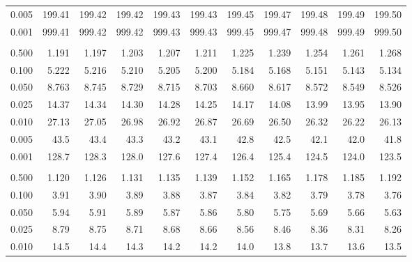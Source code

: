 \documentclass[
]{article}
\begin{document}
\begin{longtable}[t]{lrrrrrrrrrr}
\hspace{1em}0.005 & 199.41 & 199.42 & 199.42 & 199.43 & 199.43 & 199.45 & 199.47 & 199.48 & 199.49 & 199.50\\
\hspace{1em}0.001 & 999.41 & 999.42 & 999.42 & 999.43 & 999.43 & 999.45 & 999.47 & 999.48 & 999.49 & 999.50\\
\addlinespace[0.3em]
\multicolumn{11}{l}{\textbf{$k_2=3$}}\\
\hspace{1em}0.500 & 1.191 & 1.197 & 1.203 & 1.207 & 1.211 & 1.225 & 1.239 & 1.254 & 1.261 & 1.268\\
\hspace{1em}0.100 & 5.222 & 5.216 & 5.210 & 5.205 & 5.200 & 5.184 & 5.168 & 5.151 & 5.143 & 5.134\\
\hspace{1em}0.050 & 8.763 & 8.745 & 8.729 & 8.715 & 8.703 & 8.660 & 8.617 & 8.572 & 8.549 & 8.526\\
\hspace{1em}0.025 & 14.37 & 14.34 & 14.30 & 14.28 & 14.25 & 14.17 & 14.08 & 13.99 & 13.95 & 13.90\\
\hspace{1em}0.010 & 27.13 & 27.05 & 26.98 & 26.92 & 26.87 & 26.69 & 26.50 & 26.32 & 26.22 & 26.13\\
\hspace{1em}0.005 & 43.5 & 43.4 & 43.3 & 43.2 & 43.1 & 42.8 & 42.5 & 42.1 & 42.0 & 41.8\\
\hspace{1em}0.001 & 128.7 & 128.3 & 128.0 & 127.6 & 127.4 & 126.4 & 125.4 & 124.5 & 124.0 & 123.5\\
\addlinespace[0.3em]
\multicolumn{11}{l}{\textbf{$k_2=4$}}\\
\hspace{1em}0.500 & 1.120 & 1.126 & 1.131 & 1.135 & 1.139 & 1.152 & 1.165 & 1.178 & 1.185 & 1.192\\
\hspace{1em}0.100 & 3.91 & 3.90 & 3.89 & 3.88 & 3.87 & 3.84 & 3.82 & 3.79 & 3.78 & 3.76\\
\hspace{1em}0.050 & 5.94 & 5.91 & 5.89 & 5.87 & 5.86 & 5.80 & 5.75 & 5.69 & 5.66 & 5.63\\
\hspace{1em}0.025 & 8.79 & 8.75 & 8.71 & 8.68 & 8.66 & 8.56 & 8.46 & 8.36 & 8.31 & 8.26\\
\hspace{1em}0.010 & 14.5 & 14.4 & 14.3 & 14.2 & 14.2 & 14.0 & 13.8 & 13.7 & 13.6 & 13.5\\

\end{longtable}
\end{document}
